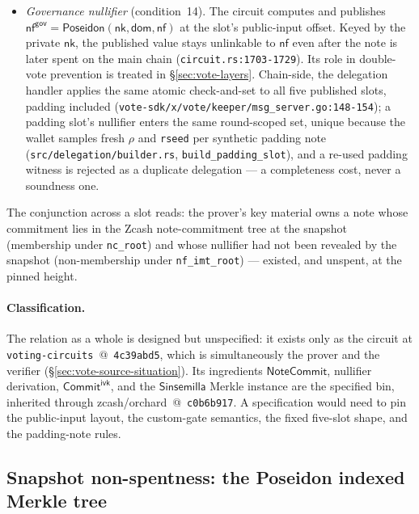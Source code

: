 \documentclass[11pt,a4paper]{article}
\theoremstyle{definition}
\newcommand{\nfsym}{\mathsf{nf}}
\newcommand{\NoteCommit}{\ensuremath{\mathsf{NoteCommit}}}
\newcommand{\Sinsemilla}{\ensuremath{\mathsf{Sinsemilla}}}
\newcommand{\CommitIvk}{\ensuremath{\mathsf{Commit}^{\mathsf{ivk}}}}
\newcommand{\nksym}{\ensuremath{\mathsf{nk}}}
\begin{document}
\begin{itemize}
  too, must carry a valid non-membership proof
  (\texttt{README.md} \S13).
\item \emph{Governance nullifier} (condition~14). The circuit computes and
  publishes
  $\nfsym^{\mathsf{gov}} = \mathsf{Poseidon}(\nksym, \mathsf{dom}, \nfsym)$
  at the slot's public-input offset. Keyed by the private $\nksym$, the
  published value stays unlinkable to $\nfsym$ even after the note is later
  spent on the main chain (\texttt{circuit.rs:1703-1729}). Its role in
  double-vote prevention is treated in \S\ref{sec:vote-layers}. Chain-side,
  the delegation handler applies the same atomic check-and-set to all five
  published slots, padding included
  (\texttt{vote-sdk/x/vote/keeper/msg\_server.go:148-154}); a padding
  slot's nullifier enters the same round-scoped set, unique because the
  wallet samples fresh $\rho$ and \texttt{rseed} per synthetic padding
  note (\texttt{src/delegation/builder.rs}, \texttt{build\_padding\_slot}),
  and a re-used padding witness is rejected as a duplicate delegation ---
  a completeness cost, never a soundness one.
\end{itemize}

The conjunction across a slot reads: the prover's key material owns a note
whose commitment lies in the Zcash note-commitment tree at the snapshot
(membership under \texttt{nc\_root}) and whose nullifier had not been
revealed by the snapshot (non-membership under \texttt{nf\_imt\_root}) ---
existed, and unspent, at the pinned height.

\paragraph{Classification.} The relation as a whole is designed but
unspecified: it exists only as the circuit at
\texttt{voting-circuits}~@~\texttt{4c39abd5}, which is simultaneously the
prover and the verifier (\S\ref{sec:vote-source-situation}). Its
ingredients \NoteCommit{}, nullifier derivation, \CommitIvk{}, and the
\Sinsemilla{} Merkle instance are the specified bin, inherited through
zcash/orchard~@~\texttt{c0b6b917}. A specification would need to pin the
public-input layout, the custom-gate semantics, the fixed five-slot shape,
and the padding-note rules.

\subsection{Snapshot non-spentness: the Poseidon indexed Merkle tree}
\label{sec:vote-imt}
\end{document}
